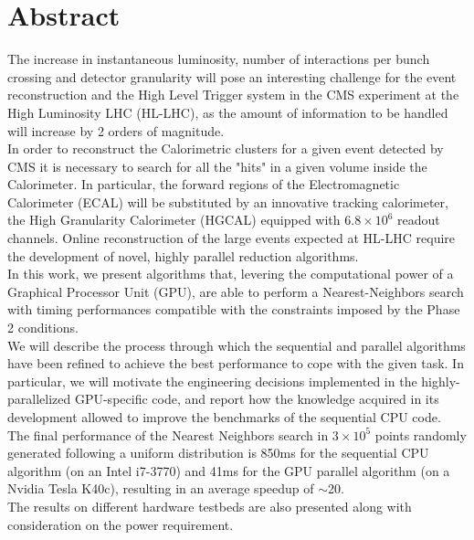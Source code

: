 \chapter*{Abstract}
\thispagestyle{empty}
The increase in instantaneous luminosity, number of interactions per bunch crossing and detector granularity will pose an interesting challenge for the event reconstruction and the High Level Trigger system in the CMS experiment at the High Luminosity LHC (HL-LHC), as the amount of information to be handled will increase by 2 orders of magnitude.\\
In order to reconstruct the Calorimetric clusters for a given event detected by CMS it is necessary to search for all the "hits" in a given volume inside the Calorimeter. In particular, the forward regions of the Electromagnetic Calorimeter (ECAL) will be substituted by an innovative tracking calorimeter, the High Granularity Calorimeter (HGCAL) equipped with $6.8\times10^6$ readout channels. Online reconstruction of the large events expected at HL-LHC require the development of novel, highly parallel reduction algorithms.\\
In this work, we present algorithms that,  levering the computational power of a Graphical Processor Unit (GPU), are able to perform a Nearest-Neighbors search with timing performances compatible with the constraints imposed by the Phase 2 conditions.\\
We will describe the process through which the sequential and parallel algorithms have been refined to achieve the best performance to cope with the given task. In particular, we will motivate the engineering decisions implemented in the highly-parallelized GPU-specific code, and report how the knowledge acquired in its development allowed to improve the benchmarks of the sequential CPU code.\\
The final performance of the Nearest Neighbors search in $3\times10^5$ points randomly generated following a uniform distribution is 850\unit{ms} for the sequential CPU algorithm (on an Intel i7-3770) and  41\unit{ms} for the GPU parallel algorithm (on a Nvidia Tesla K40c), resulting in an average speedup of $\sim$20.\\
The results on different hardware testbeds are also presented along with consideration on the power requirement.\\

\cleardoublepage

\indici

